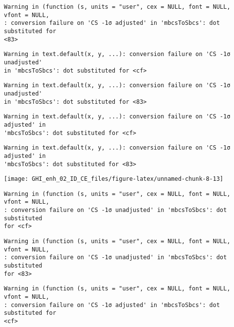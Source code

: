 \documentclass[
  10pt,
  a4paper,oneside]{article}
\begin{document}
\begin{verbatim}
Warning in (function (s, units = "user", cex = NULL, font = NULL, vfont = NULL,
: conversion failure on 'CS -1σ adjusted' in 'mbcsToSbcs': dot substituted for
<83>
\end{verbatim}

\begin{verbatim}
Warning in text.default(x, y, ...): conversion failure on 'CS -1σ unadjusted'
in 'mbcsToSbcs': dot substituted for <cf>
\end{verbatim}

\begin{verbatim}
Warning in text.default(x, y, ...): conversion failure on 'CS -1σ unadjusted'
in 'mbcsToSbcs': dot substituted for <83>
\end{verbatim}

\begin{verbatim}
Warning in text.default(x, y, ...): conversion failure on 'CS -1σ adjusted' in
'mbcsToSbcs': dot substituted for <cf>
\end{verbatim}

\begin{verbatim}
Warning in text.default(x, y, ...): conversion failure on 'CS -1σ adjusted' in
'mbcsToSbcs': dot substituted for <83>
\end{verbatim}

\begin{center}\texttt{[image: GHI\_enh\_02\_ID\_CE\_files/figure-latex/unnamed-chunk-8-13]} \end{center}

\begin{verbatim}
Warning in (function (s, units = "user", cex = NULL, font = NULL, vfont = NULL,
: conversion failure on 'CS -1σ unadjusted' in 'mbcsToSbcs': dot substituted
for <cf>
\end{verbatim}

\begin{verbatim}
Warning in (function (s, units = "user", cex = NULL, font = NULL, vfont = NULL,
: conversion failure on 'CS -1σ unadjusted' in 'mbcsToSbcs': dot substituted
for <83>
\end{verbatim}

\begin{verbatim}
Warning in (function (s, units = "user", cex = NULL, font = NULL, vfont = NULL,
: conversion failure on 'CS -1σ adjusted' in 'mbcsToSbcs': dot substituted for
<cf>
\end{verbatim}
\end{document}
